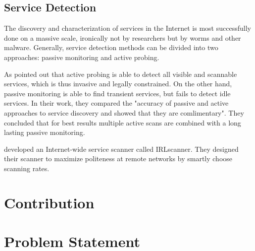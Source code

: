 \subsection{Service Detection} 

The discovery and characterization of services in the Internet is most successfully done on a massive scale, ironically not by researchers but by worms and other malware\citep{Chen:2007}. Generally, service detection methods can be divided into two approaches: passive monitoring and active probing. 

As \citet{Bartlett07b} pointed out that active probing is able to detect all visible and scannable services, which is thus invasive and legally constrained. On the other hand, passive monitoring is able to find transient services, but fails to detect idle services. In their work, they compared the "accuracy of passive and active approaches to service discovery and showed that they are comlimentary"\citep{Bartlett07b}. They concluded that for best results multiple active scans are combined with a long lasting passive monitoring. 

\citet{Leonard:2010} developed an Internet-wide service scanner called IRLscanner. They designed their scanner to maximize politeness at remote networks by smartly choose scanning rates. 

\section{Contribution\label{sec:contribution}}
\section{Problem Statement\label{sec:problem}}
